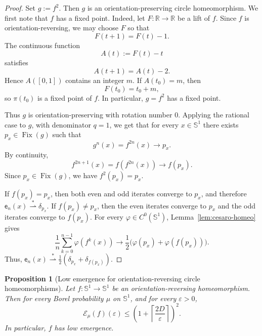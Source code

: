 \documentclass[12pt,a4paper,twoside]{article}
\theoremstyle{plain}
\newtheorem{proposition}[theorem]{Proposition}
\theoremstyle{definition}
\newcommand{\cE}{{\mathcal E}}
\newcommand{\emp}{\mathsf e}
\newcommand{\wto}{\overset{*}{\rightharpoonup}}
\begin{document}
\begin{proof}
Set $g:=f^2$. Then \(g\) is an orientation-preserving circle homeomorphism. We first note that \(f\) has a fixed point. Indeed, let
\(F:\mathbb R\to\mathbb R\) be a lift of \(f\). Since \(f\) is
orientation-reversing, we may choose \(F\) so that
\[
F(t+1)=F(t)-1.
\]
The continuous function
\[
A(t):=F(t)-t
\]
satisfies
\[
A(t+1)=A(t)-2.
\]
Hence \(A([0,1])\) contains an integer \(m\). If \(A(t_0)=m\), then
\[
F(t_0)=t_0+m,
\]
so \(\pi(t_0)\) is a fixed point of \(f\). In particular, \(g=f^2\) has a
fixed point.

Thus \(g\) is orientation-preserving with rotation number \(0\). Applying the
rational case to \(g\), with denominator \(q=1\), we get that for every
\(x\in\mathbb S^1\) there exists \(p_x\in\operatorname{Fix}(g)\) such that
\[
g^n(x)=f^{2n}(x)\longrightarrow p_x.
\]
By continuity,
\[
f^{2n+1}(x)=f(f^{2n}(x))\longrightarrow f(p_x).
\]
Since \(p_x\in\operatorname{Fix}(g)\), we have \(f^2(p_x)=p_x\).

If \(f(p_x)=p_x\), then both even and odd iterates converge to \(p_x\), and
therefore \(\emp_n(x)\wto\delta_{p_x}\). If \(f(p_x)\neq p_x\), then the
even iterates converge to \(p_x\) and the odd iterates converge to \(f(p_x)\).
For every \(\varphi\in C^0(\mathbb S^1)\), Lemma~\ref{lem:cesaro-homeo}
gives
\[
\frac1n\sum_{k=0}^{n-1}\varphi(f^k(x))
\longrightarrow
\frac12\bigl(\varphi(p_x)+\varphi(f(p_x))\bigr).
\]
Thus, $\emp_n(x)\wto
\frac12(\delta_{p_x}+\delta_{f(p_x)})$.
\end{proof}

\begin{proposition}[Low emergence for orientation-reversing circle homeomorphisms]\label{prop:circle-reversing-low}
Let \(f:\mathbb S^1\to\mathbb S^1\) be an orientation-reversing
homeomorphism. Then for every Borel probability \(\mu\) on \(\mathbb S^1\),
and for every \(\varepsilon>0\),
\[
\cE_\mu(f)(\varepsilon)
\le
\left(1+\left\lceil\frac{2D}{\varepsilon}\right\rceil\right)^2.
\]
In particular, \(f\) has low emergence.
\end{proposition}
\end{document}
